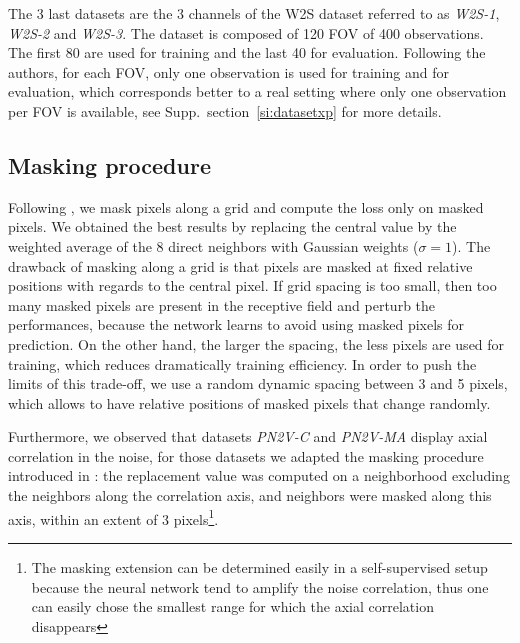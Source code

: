\documentclass{article}
\begin{document}
The 3 last datasets are the 3 channels of the W2S dataset \cite{zhou2020w2s} referred to as \emph{W2S-1}, \emph{W2S-2} and \emph{W2S-3}.
The dataset is composed of 120 FOV of 400 observations.
The first 80 are used for training and the last 40 for evaluation.
Following the authors, for each FOV, only one observation is used for training and for evaluation, which corresponds better to a real setting where only one observation per FOV is available, see Supp.~section~\ref{si:datasetxp} for more details.

\subsection{Masking procedure}
\label{sec:masking}
Following \cite{batson2019noise2self}, we mask pixels along a grid and compute the loss only on masked pixels.
We obtained the best results by replacing the central value by the weighted average of the 8 direct neighbors with Gaussian weights ($\sigma=1$).
The drawback of masking along a grid is that pixels are masked at fixed relative positions with regards to the central pixel. If grid spacing is too small, then too many masked pixels are present in the receptive field and perturb the performances, because the network learns to avoid using masked pixels for prediction. On the other hand, the larger the spacing, the less pixels are used for training, which reduces dramatically training efficiency.
In order to push the limits of this trade-off, we use a random dynamic spacing between 3 and 5 pixels, which allows to have relative positions of masked pixels that change randomly.

Furthermore, we observed that datasets \emph{PN2V-C} and \emph{PN2V-MA} display axial correlation in the noise, for those datasets we adapted the masking procedure introduced in \cite{broaddus2020removing}: the replacement value was computed on a neighborhood excluding the neighbors along the correlation axis, and neighbors were masked along this axis, within an extent of 3 pixels\footnote{The masking extension can be determined easily in a self-supervised setup because the neural network tend to amplify the noise correlation, thus one can easily chose the smallest range for which the axial correlation disappears}.
\end{document}

